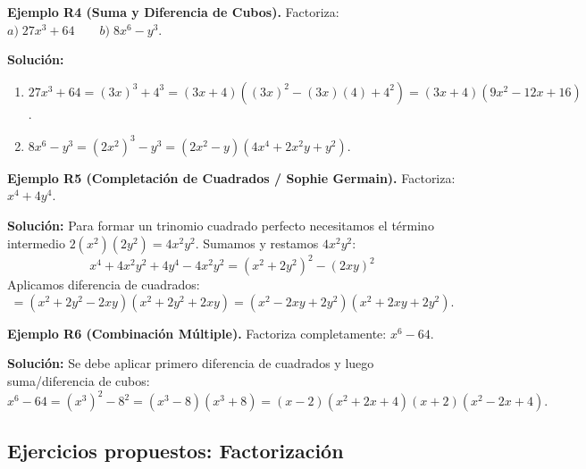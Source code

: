 \documentclass[12pt, letterpaper]{article}
\begin{document}
\textbf{Ejemplo R4 (Suma y Diferencia de Cubos).} Factoriza: $a)\; 27x^3 + 64 \qquad b)\; 8x^6 - y^3$.

\begin{cuadrosolucion}
      \textbf{Solución:}
      \begin{enumerate}
            \item[a)] $27x^3 + 64 = (3x)^3 + 4^3 = (3x + 4)((3x)^2 - (3x)(4) + 4^2) = (3x + 4)(9x^2 - 12x + 16)$.
            \item[b)] $8x^6 - y^3 = (2x^2)^3 - y^3 = (2x^2 - y)(4x^4 + 2x^2 y + y^2)$.
      \end{enumerate}
\end{cuadrosolucion}

\textbf{Ejemplo R5 (Completación de Cuadrados / Sophie Germain).} Factoriza: $x^4 + 4y^4$.

\begin{cuadrosolucion}
      \textbf{Solución:}
      Para formar un trinomio cuadrado perfecto necesitamos el término intermedio $2(x^2)(2y^2) = 4x^2 y^2$. Sumamos y restamos $4x^2 y^2$:
      $$x^4 + 4x^2 y^2 + 4y^4 - 4x^2 y^2 = (x^2 + 2y^2)^2 - (2xy)^2$$
      Aplicamos diferencia de cuadrados:
      $$= (x^2 + 2y^2 - 2xy)(x^2 + 2y^2 + 2xy) = (x^2 - 2xy + 2y^2)(x^2 + 2xy + 2y^2).$$
\end{cuadrosolucion}

\textbf{Ejemplo R6 (Combinación Múltiple).} Factoriza completamente: $x^6 - 64$.

\begin{cuadrosolucion}
      \textbf{Solución:}
      Se debe aplicar primero diferencia de cuadrados y luego suma/diferencia de cubos:
      $$x^6 - 64 = (x^3)^2 - 8^2 = (x^3 - 8)(x^3 + 8) = (x - 2)(x^2 + 2x + 4)(x + 2)(x^2 - 2x + 4).$$
\end{cuadrosolucion}

\subsection{Ejercicios propuestos: Factorización}
\end{document}
